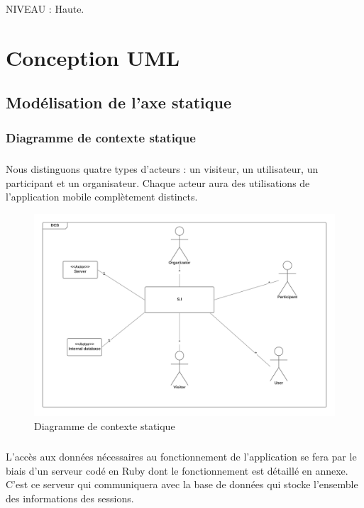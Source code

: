 \documentclass[titlepage, 12pt]{report}
\begin{document}
NIVEAU : Haute.


\chapter{Conception UML}

\section{Modélisation de l'axe statique}

\subsection{Diagramme de contexte statique}

\paragraph{}Nous distinguons quatre types d'acteurs : un visiteur, un utilisateur, un participant et un organisateur. Chaque acteur aura des utilisations de l'application mobile complètement distincts. 

\begin{figure}
	\caption{Diagramme de contexte statique}
	\label{statique_diagram}
	\centering
	\includegraphics[scale=0.2]{Images/diagram/static_diagram.png}
\end{figure}

\clearpage

\paragraph{}L'accès aux données nécessaires au fonctionnement de l'application se fera par le biais d'un serveur codé en Ruby dont le fonctionnement est détaillé en annexe. C'est ce serveur qui communiquera avec la base de données qui stocke l'ensemble des informations des sessions.
\end{document}
